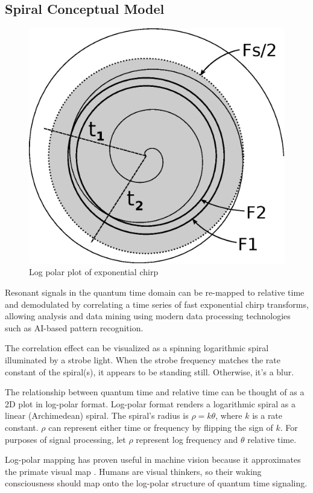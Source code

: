 \subsection{Spiral Conceptual Model}

\begin{figure}[h]
	\centering
	\includegraphics[width=0.7\linewidth]{../source/spiral_e}
	\caption[Quantum to Relative Time Relation]{Log polar plot of exponential chirp}
	\label{fig:spiral}
\end{figure}

Resonant signals in the quantum time domain can be re-mapped to relative time
and demodulated by correlating a time series of fast exponential chirp
transforms, allowing analysis and data mining using modern data
processing technologies such as AI-based pattern recognition.

The correlation effect can be visualized as a spinning logarithmic spiral
illuminated by a strobe light. When the strobe frequency matches the rate
constant of the spiral(s), it appears to be standing still.
Otherwise, it's a blur.

The relationship between quantum time and relative time can be thought of as a
2D plot in log-polar format.
Log-polar format renders a logarithmic spiral as a linear (Archimedean) spiral.
The spiral's radius is $\rho = k\theta$, where $k$ is a rate constant.
$\rho$ can represent either time or frequency by flipping the sign of $k$.
For purposes of signal processing, let $\rho$ represent log frequency and
$\theta$ relative time.

Log-polar mapping has proven useful in machine vision \cite{Bonmassar}
because it approximates the primate visual map \cite{Schwartz}.
Humans are visual thinkers, so their waking consciousness should map onto the
log-polar structure of quantum time signaling.

